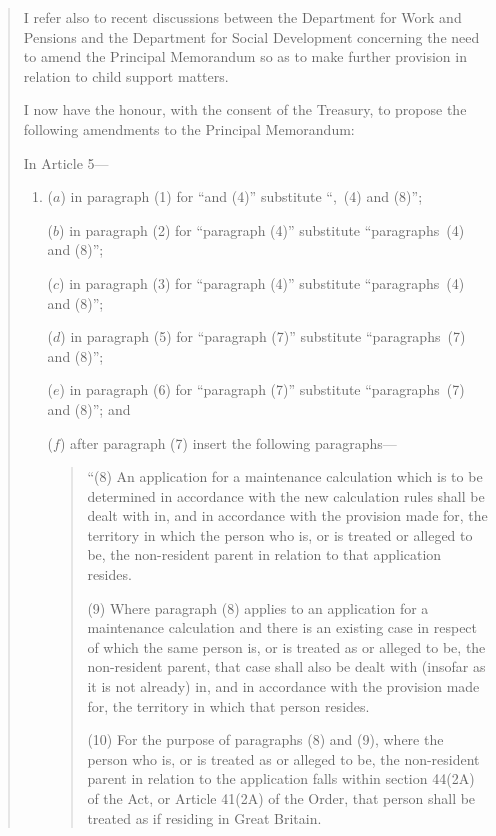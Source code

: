 \documentclass[12pt,a4paper]{article}
\begin{document}
\begin{quotation}
I refer also to recent discussions between the Department for Work and Pensions and the Department for Social Development concerning the need to amend the Principal Memorandum so as to make further provision in relation to child support matters.

I now have the honour, with the consent of the Treasury, to propose the following amendments to the Principal Memorandum:

In Article 5---
\begin{enumerate}\item[]
($a$) in paragraph (1) for ``and (4)'' substitute ``,~(4) and (8)'';

\begin{sloppypar}
($b$) in paragraph (2) for ``paragraph (4)'' substitute ``paragraphs~(4) and (8)'';
\end{sloppypar}

\begin{sloppypar}
($c$) in paragraph (3) for ``paragraph (4)'' substitute ``paragraphs~(4) and (8)'';
\end{sloppypar}

\begin{sloppypar}
($d$) in paragraph (5) for ``paragraph (7)'' substitute ``paragraphs~(7) and (8)'';
\end{sloppypar}

\begin{sloppypar}
($e$) in paragraph (6) for ``paragraph (7)'' substitute ``paragraphs~(7) and (8)''; and
\end{sloppypar}

($f$) after paragraph (7) insert the following paragraphs---
\begin{quotation}
``(8) An application for a maintenance calculation which is to be determined in accordance with the new calculation rules shall be dealt with in, and in accordance with the provision made for, the territory in which the person who is, or is treated or alleged to be, the non-resident parent in relation to that application resides.

(9) Where paragraph (8) applies to an application for a maintenance calculation and there is an existing case in respect of which the same person is, or is treated as or alleged to be, the non-resident parent, that case shall also be dealt with (insofar as it is not already) in, and in accordance with the provision made for, the territory in which that person resides.

(10) For the purpose of paragraphs (8) and (9), where the person who is, or is treated as or alleged to be, the non-resident parent in relation to the application falls within section 44(2A) of the Act, or Article 41(2A) of the Order, that person shall be treated as if residing in Great Britain.


\end{quotation}
\end{enumerate}
\end{quotation}
\end{document}
